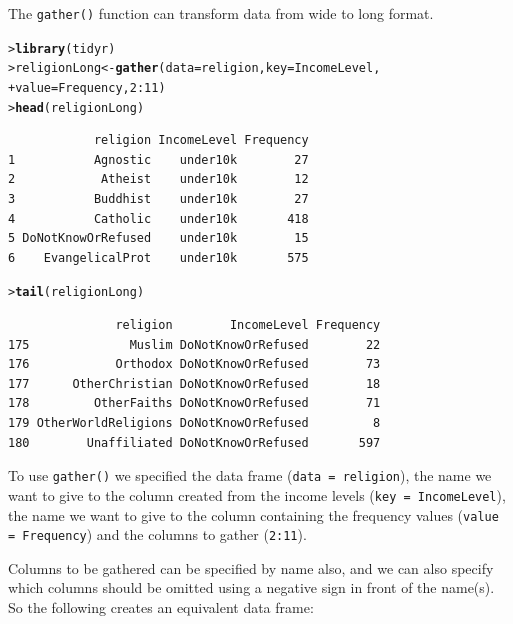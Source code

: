 \documentclass[12pt,oneside]{book}\usepackage[]{graphicx}\usepackage[]{color}
\makeatletter
\newcommand{\hlnum}[1]{\textcolor[rgb]{0.686,0.059,0.569}{#1}}%
\newcommand{\hlopt}[1]{\textcolor[rgb]{0,0,0}{#1}}%
\newcommand{\hlstd}[1]{\textcolor[rgb]{0.345,0.345,0.345}{#1}}%
\newcommand{\hlkwb}[1]{\textcolor[rgb]{0.69,0.353,0.396}{#1}}%
\newcommand{\hlkwc}[1]{\textcolor[rgb]{0.333,0.667,0.333}{#1}}%
\newcommand{\hlkwd}[1]{\textcolor[rgb]{0.737,0.353,0.396}{\textbf{#1}}}%
\newenvironment{kframe}{%
 \def\at@end@of@kframe{}%
 \ifinner\ifhmode%
  \def\at@end@of@kframe{\end{minipage}}%
  \begin{minipage}{\columnwidth}%
 \fi\fi%
 \def\FrameCommand##1{\hskip\@totalleftmargin \hskip-\fboxsep
 \colorbox{shadecolor}{##1}\hskip-\fboxsep
     \hskip-\linewidth \hskip-\@totalleftmargin \hskip\columnwidth}%
 \MakeFramed {\advance\hsize-\width
   \@totalleftmargin\z@ \linewidth\hsize
   \@setminipage}}%
 {\par\unskip\endMakeFramed%
 \at@end@of@kframe}
\newenvironment{knitrout}{}{} %
\makeatother
\begin{document}
The \verb+gather()+ function can transform data from wide to long format. 

\begin{knitrout}
\color{fgcolor}\begin{kframe}
\begin{alltt}
\hlstd{> }\hlkwd{library}\hlstd{(tidyr)}
\hlstd{> }\hlstd{religionLong} \hlkwb{<-} \hlkwd{gather}\hlstd{(}\hlkwc{data} \hlstd{= religion,} \hlkwc{key} \hlstd{= IncomeLevel,}
\hlstd{+ }                       \hlkwc{value} \hlstd{= Frequency,} \hlnum{2}\hlopt{:}\hlnum{11}\hlstd{)}
\hlstd{> }\hlkwd{head}\hlstd{(religionLong)}
\end{alltt}
\begin{verbatim}
            religion IncomeLevel Frequency
1           Agnostic    under10k        27
2            Atheist    under10k        12
3           Buddhist    under10k        27
4           Catholic    under10k       418
5 DoNotKnowOrRefused    under10k        15
6    EvangelicalProt    under10k       575
\end{verbatim}
\begin{alltt}
\hlstd{> }\hlkwd{tail}\hlstd{(religionLong)}
\end{alltt}
\begin{verbatim}
               religion        IncomeLevel Frequency
175              Muslim DoNotKnowOrRefused        22
176            Orthodox DoNotKnowOrRefused        73
177      OtherChristian DoNotKnowOrRefused        18
178         OtherFaiths DoNotKnowOrRefused        71
179 OtherWorldReligions DoNotKnowOrRefused         8
180        Unaffiliated DoNotKnowOrRefused       597
\end{verbatim}
\end{kframe}
\end{knitrout}
To use \verb+gather()+ we specified the data frame (\verb+data = religion+), the name we want to give to the column created from the income levels (\verb+key = IncomeLevel+), the name we want to give to the column containing the frequency values (\verb+value = Frequency+) and the columns to gather (\verb+2:11+). 

Columns to be gathered can be specified by name also, and we can also specify which columns should be omitted using a negative sign in front of the name(s). So the following creates an equivalent data frame:
\end{document}
